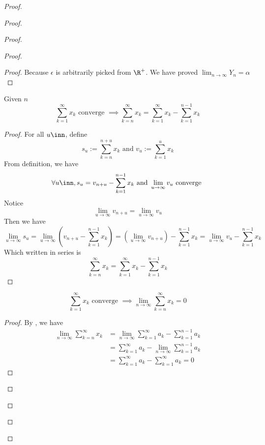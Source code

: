 \documentclass{report}
\begin{document}
\begin{proof}
\begin{proof}
\begin{proof}
\begin{proof}
\begin{proof}
Because $\epsilon $ is arbitrarily picked from $\R^+$. We have proved  $\lim_{n\to\infty}Y_n=\alpha $
\end{proof}
\begin{lemma}
\label{11.4.2}
Given $n$
\begin{equation}
  \sum_{k=1}^\infty x_k\text{ converge }\implies \sum_{k=n}^\infty x_k=\sum_{k=1}^\infty x_k-\sum_{k=1}^{n-1}x_k
\end{equation}
\end{lemma}
\begin{proof}
For all $u\inn$, define 
\begin{equation}
s_u:=\sum_{k=n}^{n+u}x_k\text{ and }v_u:=\sum_{k=1}^{u}x_k
\end{equation}
From definition, we have
\begin{equation}
  \forall u\inn,s_u=v_{n+u}-\sum_{k=1}^{n-1}x_k\text{ and }\lim_{u\to\infty}v_u\text{ converge }
\end{equation}
Notice 
\begin{equation}
\lim_{u\to\infty}v_{n+u}=\lim_{u\to\infty}v_u
\end{equation}
Then we have
\begin{equation}
\lim_{u\to\infty}s_u=\lim_{u\to\infty} (v_{n+u}-\sum_{k=1}^{n-1}x_k)=(\lim_{u\to\infty}v_{n+u})-\sum_{k=1}^{n-1}x_k=\lim_{u\to\infty}v_u-\sum_{k=1}^{n-1}x_k
\end{equation}
Which written in series is
\begin{equation}
\sum_{k=n}^{\infty} x_k=\sum_{k=1}^\infty x_k-\sum_{k=1}^{n-1}x_k
\end{equation}
\end{proof}
\begin{lemma}
\label{11.4.3}
\begin{equation}
\sum_{k=1}^\infty x_k\text{ converge }\implies \lim_{n\to\infty}\sum_{k=n}^\infty x_k=0
\end{equation}
\end{lemma}
\begin{proof} 
By , we have
\begin{align}
  \lim_{n\to\infty}\sum_{k=n}^\infty x_k&=\lim_{n\to\infty}\sum_{k=1}^\infty a_k-\sum_{k=1}^{n-1}a_k\\
  &=\sum_{k=1}^\infty a_k-\lim_{n\to\infty}\sum_{k=1}^{n-1}a_k\\
  &=\sum_{k=1}^\infty a_k-\sum_{k=1}^\infty a_k=0
\end{align}
\end{proof}
\begin{question}{}{}

\end{question}
\end{proof}
\end{proof}
\end{proof}
\end{proof}
\end{document}
